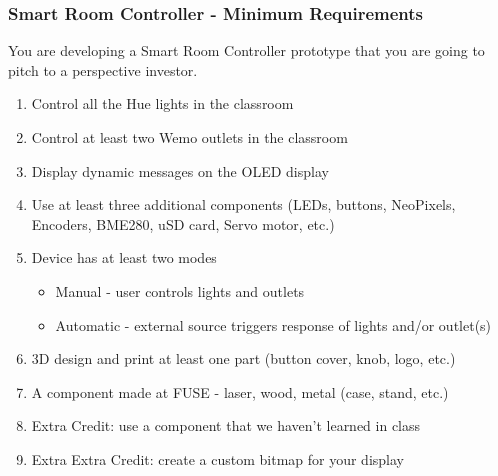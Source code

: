 \documentclass{beamer}
\begin{document}
\begin{frame}\frametitle{Smart Room Controller - Minimum Requirements}
You are developing a Smart Room Controller prototype that you are going to pitch to a perspective investor. 
\begin{enumerate}
\item Control all the Hue lights in the classroom
\item Control at least two Wemo outlets in the classroom
\item Display dynamic messages on the OLED display 
\item Use at least three additional components (LEDs, buttons, NeoPixels, Encoders, BME280, uSD card, Servo motor, etc.)
\item Device has at least two modes
\begin{itemize}
\item Manual - user controls lights and outlets
\item Automatic - external source triggers response of lights and/or outlet(s)
\end{itemize}
\item 3D design and print at least one part (button cover, knob, logo, etc.)
\item A component made at FUSE - laser, wood, metal (case, stand, etc.) 
\item Extra Credit: use a component that we haven't learned in class
\item Extra Extra Credit: create a custom bitmap for your display
\end{enumerate}
\end{frame}
\end{document}
